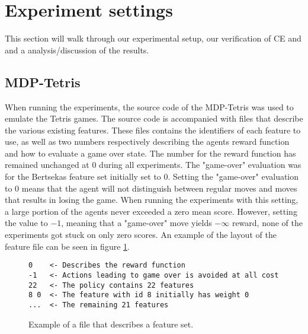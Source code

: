 \section{Experiment settings}

This section will walk through our experimental setup, our verification of CE and 
and a analysis/discussion of the results.

\subsection{MDP-Tetris}

When running the experiments, the source code of the MDP-Tetris
\citep{mdptetris} was used to emulate the Tetris games.
The source code is accompanied with files that describe the
various existing features. These files contains the identifiers of 
each feature to use, as well as two numbers respectively describing 
the agents reward function and how to evaluate a game over state. 
The number for the reward function has remained unchanged at $0$ 
during all experiments. The "game-over" evaluation was for the
Bertsekas feature set initially set to $0$. Setting the 
"game-over" evaluation to $0$ means that the agent will not 
distinguish between regular moves and moves that results in losing
the game. When running the experiments with this setting, a large portion
of the agents never exceeded a zero mean score. However, setting the value
to $-1$, meaning that a "game-over" move yields $-\infty$ reward, 
none of the experiments got stuck on only zero scores. An example
of the layout of the feature file can be seen in figure \ref{fig:featfile}.
\begin{figure}[h!]
\centering
\begin{lstlisting}
0    <- Describes the reward function
-1   <- Actions leading to game over is avoided at all cost
22   <- The policy contains 22 features
8 0  <- The feature with id 8 initially has weight 0
...  <- The remaining 21 features
\end{lstlisting}
\caption{Example of a file that describes a feature set. \label{fig:featfile}}
\end{figure}

 
